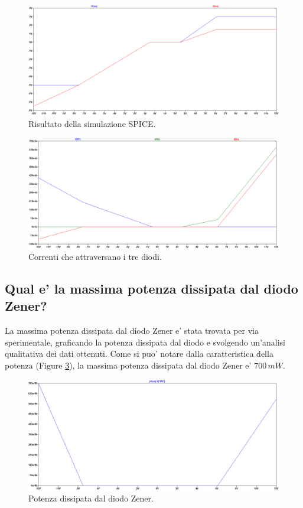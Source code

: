 \documentclass[a4paper,10pt]{article}
\begin{document}
\begin{figure}[h!]
  	\centering
 	\includegraphics[width=1\linewidth]{es1-2.png}
  	\caption{Risultato della simulazione SPICE.}
  	\label{fig:spice1}
\end{figure}

\begin{figure}[h!]
  	\centering
 	\includegraphics[width=1\linewidth]{es1-2-1.png}
  	\caption{Correnti che attraversano i tre diodi.}
  	\label{fig:dioditot}
\end{figure}

\vspace*{1cm}

\subsection{Qual e' la massima potenza dissipata dal diodo Zener?}
La massima potenza dissipata dal diodo Zener e' stata trovata per via sperimentale, graficando la potenza dissipata dal diodo e svolgendo un'analisi qualitativa dei dati ottenuti. Come si puo' notare dalla caratteristica della potenza (Figure \ref{fig:pwd1}), la massima potenza dissipata dal diodo Zener e' $700\,mW$.

\begin{figure}[h!]
  	\centering
 	\includegraphics[width=1\linewidth]{es1-3.png}
  	\caption{Potenza dissipata dal diodo Zener.}
  	\label{fig:pwd1}
\end{figure}
\end{document}
